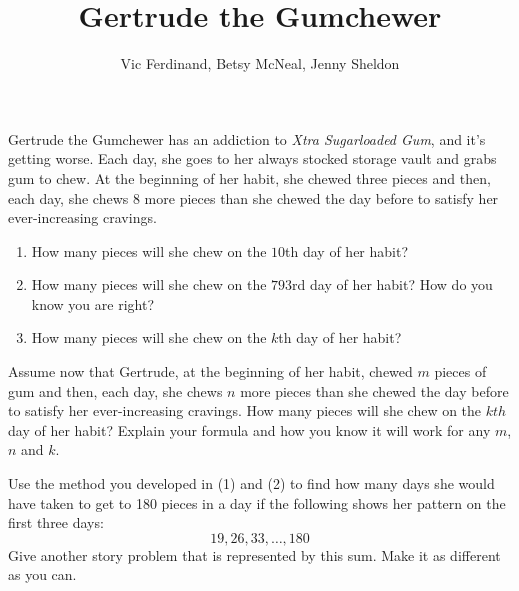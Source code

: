 \documentclass{ximera}
\title{Gertrude the Gumchewer}
\author{Vic Ferdinand, Betsy McNeal, Jenny Sheldon}
\begin{document}
\begin{abstract}
\end{abstract}
\maketitle



\begin{problem}
Gertrude the Gumchewer has an addiction to \textit{Xtra Sugarloaded
  Gum}, and it's getting worse.  Each day, she goes to her always
stocked storage vault and grabs gum to chew.  At the beginning of her
habit, she chewed three pieces and then, each day, she chews 8 more
pieces than she chewed the day before to satisfy her ever-increasing
cravings.
\begin{enumerate}
\item How many pieces will she chew on the $10$th day of her habit?
\item How many pieces will she chew on the $793$rd day of her habit? How do you know you are right?
\item How many pieces will she chew on the $k$th day of her habit?
\end{enumerate}
\end{problem}



\begin{problem}
Assume now that Gertrude, at the beginning of her habit, chewed $m$
pieces of gum and then, each day, she chews $n$ more pieces than she
chewed the day before to satisfy her ever-increasing cravings.  How many pieces will she chew on the $kth$
  day of her habit? Explain your formula and how you know it will work for any $m$, $n$ and $k$.  
\end{problem}

\begin{problem}
Use the method you developed in (1) and (2) to find how many days she would have taken to get to 180 pieces in a day if the following shows her pattern on the first three days:
\[
19, 26, 33, \dots , 180
\]
Give another story problem that is represented by this sum.  Make it as different as you can.
\end{problem}

\newpage
\end{document}
